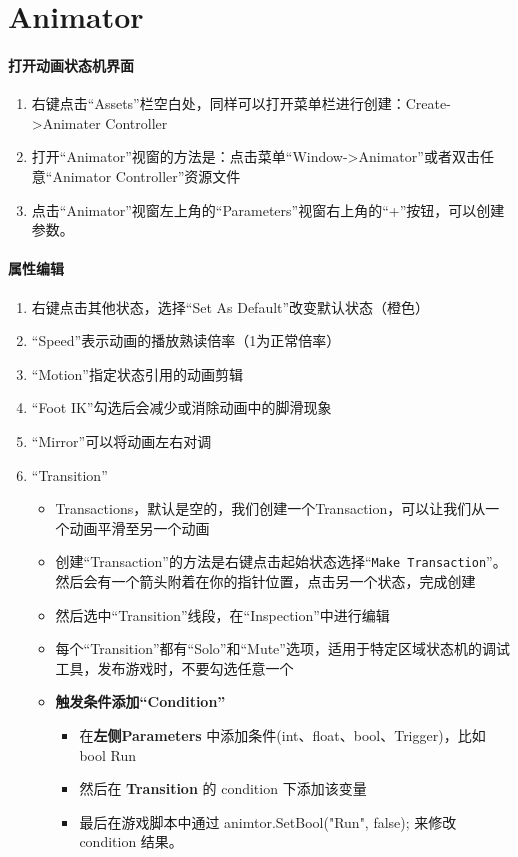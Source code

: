 \documentclass[UTF8,a4paper,12pt]{ctexbook}
\begin{document}
	
			
	\section{Animator}

		\paragraph{打开动画状态机界面}	
				\begin{enumerate}
					\item 右键点击“Assets”栏空白处，同样可以打开菜单栏进行创建：Create->Animater Controller
					\item 打开“Animator”视窗的方法是：点击菜单“Window->Animator”或者双击任意“Animator Controller”资源文件
					\item 点击“Animator”视窗左上角的“Parameters”视窗右上角的“+”按钮，可以创建参数。
				\end{enumerate}
	
		\paragraph{属性编辑}
			\begin{enumerate}
				\item 右键点击其他状态，选择“Set As Default”改变默认状态（橙色）
				\item “Speed”表示动画的播放熟读倍率（1为正常倍率）
				\item “Motion”指定状态引用的动画剪辑
				\item “Foot IK”勾选后会减少或消除动画中的脚滑现象
				\item “Mirror”可以将动画左右对调
				\item “Transition”
					\begin{itemize}
						\item Transactions，默认是空的，我们创建一个Transaction，可以让我们从一个动画平滑至另一个动画
						\item 创建“Transaction”的方法是右键点击起始状态选择“\verb|Make Transaction|”。然后会有一个箭头附着在你的指针位置，点击另一个状态，完成创建
						\item 然后选中“Transition”线段，在“Inspection”中进行编辑
						\item 每个“Transition”都有“Solo”和“Mute”选项，适用于特定区域状态机的调试工具，发布游戏时，不要勾选任意一个
						\item \textbf{触发条件添加“Condition”}
							\begin{itemize}
								\item 在\textbf{左侧Parameters} 中添加条件(int、float、bool、Trigger)，比如bool Run
								\item 然后在 \textbf{Transition} 的 condition 下添加该变量
								\item 最后在游戏脚本中通过 animtor.SetBool("Run", false); 来修改condition 结果。
							\end{itemize}
					\end{itemize}
			\end{enumerate}
\end{document}
